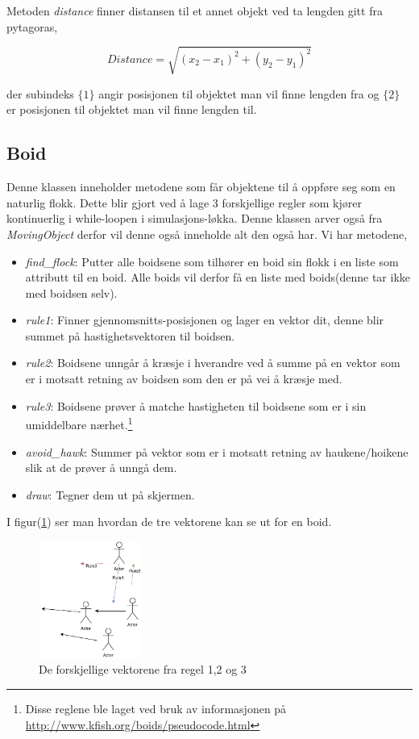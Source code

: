 {Metoden \emph{distance} finner distansen til et annet objekt ved ta lengden gitt fra pytagoras,

\begin{equation*}
    Distance = \sqrt{(x_{2} - x_{1})^2 + (y_{2} - y_{1})^2}
\end{equation*}

der subindeks $\{1\}$ angir posisjonen til objektet man vil finne lengden fra og $\{2\}$ er posisjonen til objektet man vil finne lengden til.

\subsection{Boid}

Denne klassen inneholder metodene som får objektene til å oppføre seg som en naturlig flokk. Dette blir gjort ved å lage 3 forskjellige regler som kjører kontinuerlig i while-loopen i simulasjons-løkka. Denne klassen arver også fra \emph{MovingObject} derfor vil denne også inneholde alt den også har. Vi har metodene,

\begin{itemize}
    \item \emph{find\_flock}: Putter alle boidsene som tilhører en boid sin flokk i en liste som attributt til en boid. Alle boids vil derfor få en liste med boids(denne tar ikke med boidsen selv).
    \item \emph{rule1}: Finner gjennomsnitts-posisjonen og lager en vektor dit, denne blir summet på hastighetsvektoren til boidsen.
    \item \emph{rule2}: Boidsene unngår å kræsje i hverandre ved å summe på en vektor som er i motsatt retning av boidsen som den er på vei å kræsje med.
    \item \emph{rule3}: Boidsene prøver å matche hastigheten til boidsene som er i sin umiddelbare nærhet.\footnote{Disse reglene ble laget ved bruk av informasjonen på \url{http://www.kfish.org/boids/pseudocode.html}}
    \item \emph{avoid\_hawk}: Summer på vektor som er i motsatt retning av haukene/hoikene slik at de prøver å unngå dem.
    \item \emph{draw}: Tegner dem ut på skjermen.
\end{itemize}

I figur(\ref{rules}) ser man hvordan de tre vektorene kan se ut for en boid.
\begin{figure}[hbt!]
{\centering
    \includegraphics[width=0.30\textwidth]{rules.pdf}
    \caption{De forskjellige vektorene fra regel 1,2 og 3}
    \label{rules}
\par}
\end{figure}

}
